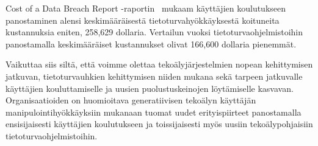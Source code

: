 \begin{otherlanguage}{finnish}
Cost of a Data Breach Report -raportin~\citep{ibm_Cost_Data_Breach_Report_2024} mukaam käyttäjien koulutukseen panostaminen alensi keskimääräisestä tietoturvahyökkäyksestä koituneita kustannuksia eniten, 258,629 dollaria. Vertailun vuoksi tietoturvaohjelmistoihin panostamalla keskimääräiset kustannukset olivat 166,600 dollaria pienemmät.



Vaikuttaa siis siltä, että voimme olettaa tekoälyjärjestelmien nopean kehittymisen jatkuvan, tietoturvauhkien kehittymisen niiden mukana sekä tarpeen jatkuvalle käyttäjien kouluttamiselle ja uusien puolustuskeinojen löytämiselle kasvavan. Organisaatioiden on huomioitava generatiivisen tekoälyn käyttäjän manipulointihyökkäyksiin mukanaan tuomat uudet erityispiirteet panostamalla ensisijaisesti käyttäjien koulutukseen ja toissijaisesti myös uusiin tekoälypohjaisiin tietoturvaohjelmistoihin.





\end{otherlanguage}


